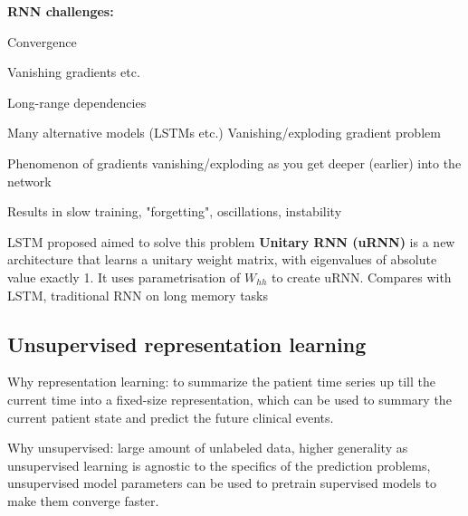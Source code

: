 \documentclass[12pt]{article}
\begin{document}
\ule
\textbf{RNN challenges:}
\ulb
\item Convergence
\item Vanishing gradients etc.
\item Long-range dependencies
\item Many alternative models (LSTMs etc.)
\ule
Vanishing/exploding gradient problem
\ulb
\item Phenomenon of gradients vanishing/exploding as you get deeper (earlier) into the network
\item Results in slow training, "forgetting", oscillations, instability
\item LSTM proposed aimed to solve this problem
\ule
\textbf{Unitary RNN (uRNN)} is a new architecture that learns a unitary weight matrix, with eigenvalues of absolute value exactly 1. It uses parametrisation of $W_{hh}$ to create uRNN. Compares with LSTM, traditional RNN on long memory tasks

\subsection{Unsupervised representation learning}
\par Why representation learning: to summarize the patient time series up till the current time into a fixed-size representation, which can be used to summary the current patient state and predict the future clinical events.
\par Why unsupervised: large amount of unlabeled data, higher generality as unsupervised learning is agnostic to the specifics of the prediction problems, unsupervised model parameters can be used to pretrain supervised models to make them converge faster.
\end{document}
